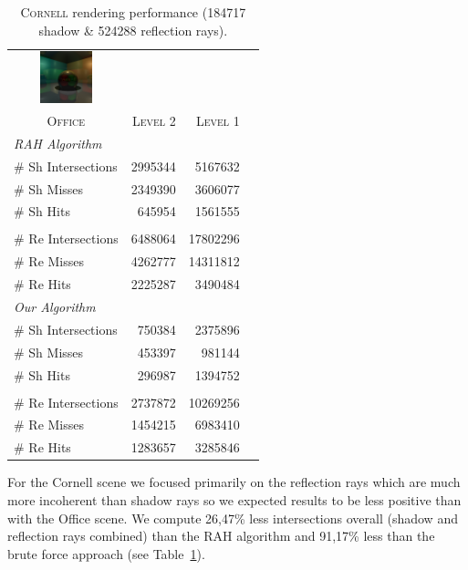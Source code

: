 \documentclass{egpubl}
\begin{document}
\begin{table}[!htb]
\begin{center}
\fontsize{7}{9}
\selectfont
\begin{tabular}{l|rrr}
    \multicolumn{1}{c}{\includegraphics[width=1.5cm]{Images/Cornell_Preview}} & & \\
    \multicolumn{1}{c|}{\textsc{Office}} & \textsc{Level 2} & \textsc{Level 1}\\
    \hline
    \emph{RAH Algorithm} & & \\
    \hline
    \quad \# Sh Intersections   & 2995344   & 5167632		  \\
    \quad \# Sh Misses             & 2349390   & 3606077		  \\
    \quad \# Sh Hits               & 645954    & 1561555		  \\
    & & \\
    \quad \# Re Intersections   & 6488064   & 17802296		  \\
    \quad \# Re Misses             & 4262777   & 14311812		  \\
    \quad \# Re Hits               & 2225287   & 3490484		  \\
    \hline
    \emph{Our Algorithm} & & \\
    \hline
    \quad \# Sh Intersections   & 750384    & 2375896		  \\
    \quad \# Sh Misses          & 453397    & 981144		  \\
    \quad \# Sh Hits            & 296987	& 1394752  	      \\
    & & \\
    \quad \# Re Intersections   & 2737872   & 10269256		  \\
    \quad \# Re Misses             & 1454215   & 6983410		  \\
    \quad \# Re Hits               & 1283657   & 3285846   	  \\     
\end{tabular}
\end{center}
\caption{\label{table:cornell-results}
\textsc{Cornell} rendering performance (184717 shadow \& 524288 reflection rays).}
\end{table}

For the Cornell scene we focused primarily on the reflection rays which are much more incoherent than shadow rays so we expected results to be less positive than with the Office scene. We compute 26,47\% less intersections overall (shadow and reflection rays combined) than the RAH algorithm and 91,17\% less than the brute force approach (see Table~\ref{table:cornell-results}).
\end{document}
